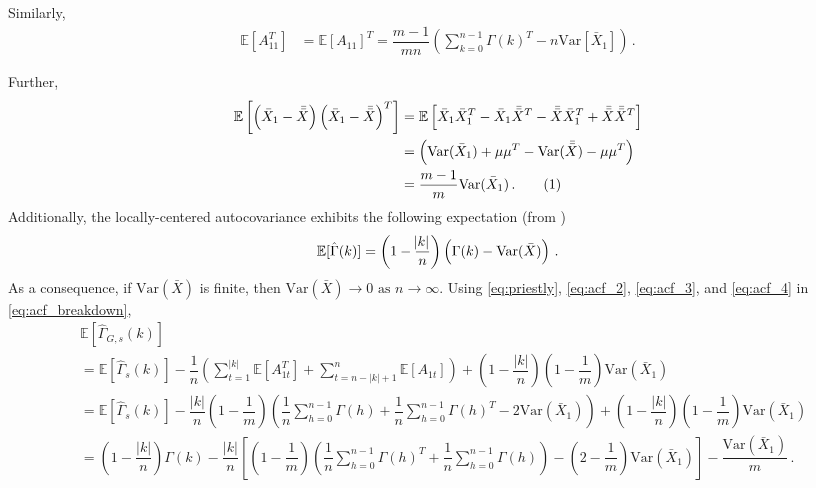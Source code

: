 \documentclass[11pt]{article}
\newcommand{\E}{\mathbb{E}}
\newcommand{\Var}{\text{Var}}
\newcommand\numberthis{\addtocounter{equation}{1}\tag{\theequation}}
\theoremstyle{remark}
\begin{document}
%
Similarly,
%    
\begin{align}
\label{eq:acf_3}
    \mathbb{E} \left[ A_{11}^T \right] &= \mathbb{E}\left[ A_{11}\right]^T = \dfrac{m-1}{mn}\left(\sum_{k=0}^{n-1}\Gamma(k)^T - n\text{Var}\left[\bar{X}_1 \right] \right)\,.
\end{align}


Further,
\begin{align*}
\mathbb{E}\left[ \left(\bar{X}_{1} - \bar{\bar{X}} \right)  \left(\bar{X}_{1} - \bar{\bar{X}} \right)^{T}\right] &= \mathbb{E}\left[ \bar{X}_{1}\bar{X}_{1}^{T} - \bar{X}_{1}\bar{\bar{X}}^{T} - \bar{\bar{X}} \bar{X}_{1}^{T} + \bar{\bar{X}}\bar{\bar{X}}^{T}\right]\\
&= \left(\Var(\bar{X}_{1}) + \mu\mu^{T} - \Var(\bar{\bar{X}}) - \mu\mu^{T}\right)\\
&= \dfrac{m-1}{m}\Var(\bar{X}_1)\,. \numberthis \label{eq:acf_4}
\end{align*}
%
Additionally, the locally-centered autocovariance exhibits the following expectation (from \cite{priestley1981spectral})
 \begin{equation} \label{eq:priestly}
     \mathbb{E}[\hat{\Gamma}(k)] = \left(1- \dfrac{\abs{k}}{n}\right)\left(\Gamma(k) - \Var{(\bar{X})}
 \right)\,.
 \end{equation}
%
As a consequence, if $\Var(\bar{X})$ is finite, then $\Var(\bar{X}) \to 0 \textrm{ as } n \to \infty$.
Using \eqref{eq:priestly}, \eqref{eq:acf_2}, \eqref{eq:acf_3}, and \eqref{eq:acf_4} in \eqref{eq:acf_breakdown},
\begin{align*}
    & \E \left[\hat{\Gamma}_{G,s}(k) \right] \\
    &= \mathbb{E}\left[\hat{\Gamma}_{s}(k)\right] - \dfrac{1}{n} \left(\sum\limits_{t=1}^{|k|}\mathbb{E}[A_{1t}^T] + \sum\limits_{t=n-|k|+1}^{n}\mathbb{E}[A_{1t}]\right) + \left(1- \dfrac{|k|}{n}\right)\left(1-\dfrac{1}{m}\right)\Var(\bar{X}_1)\\
    &= \mathbb{E}\left[\hat{\Gamma}_{s}(k)\right] - \dfrac{|k|}{n}\left(1-\dfrac{1}{m}\right)\left(\dfrac{1}{n}\sum_{h=0}^{n-1}\Gamma(h) + \dfrac{1}{n}\sum_{h=0}^{n-1}\Gamma(h)^T - 2 \Var(\bar{X}_1)\right) + \left(1- \dfrac{|k|}{n}\right)\left(1-\dfrac{1}{m}\right)\Var(\bar{X}_1)\\
    &= \left(1- \dfrac{|k|}{n}\right)\Gamma(k) - \dfrac{|k|}{n}\left[\left(1-\dfrac{1}{m}\right)\left(\dfrac{1}{n}\sum_{h=0}^{n-1}\Gamma(h)^T + \dfrac{1}{n}\sum_{h=0}^{n-1}\Gamma(h)\right) - \left(2-\dfrac{1}{m}\right) \Var(\bar{X}_1)\right] - \dfrac{\Var(\bar{X}_1)}{m}\,.
\end{align*}
%
\end{document}
